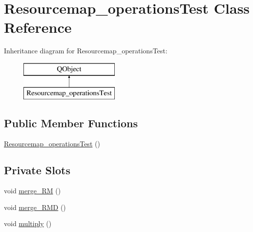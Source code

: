 \hypertarget{classResourcemap__operationsTest}{\section{Resourcemap\-\_\-operations\-Test Class Reference}
\label{classResourcemap__operationsTest}
}
Inheritance diagram for Resourcemap\-\_\-operations\-Test\-:\begin{figure}[H]
\begin{center}
\leavevmode
\includegraphics[height=2.000000cm]{classResourcemap__operationsTest}
\end{center}
\end{figure}
\subsection*{Public Member Functions}
\begin{DoxyCompactItemize}
\item 
\hyperlink{classResourcemap__operationsTest_a89e7689e4438827faab3d9b6845b9d84}{Resourcemap\-\_\-operations\-Test} ()
\end{DoxyCompactItemize}
\subsection*{Private Slots}
\begin{DoxyCompactItemize}
\item 
void \hyperlink{classResourcemap__operationsTest_a1f9ef8deb19bcdb07e4278ea142f7d2e}{merge\-\_\-\-R\-M} ()
\item 
void \hyperlink{classResourcemap__operationsTest_a993905385f445d0fcaba1d0fdea05c7e}{merge\-\_\-\-R\-M\-D} ()
\item 
void \hyperlink{classResourcemap__operationsTest_aefb8098c48eba65155ffbfff1c527c3b}{multiply} ()
\end{DoxyCompactItemize}
